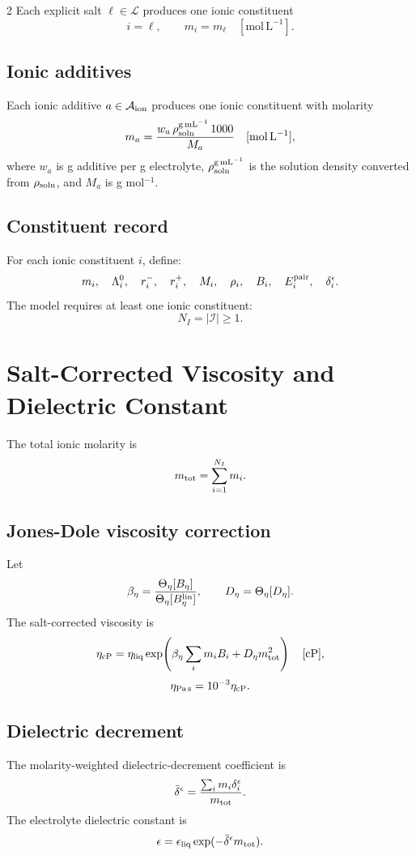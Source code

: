 \documentclass[10pt]{article}
\newcommand{\molL}{\mathrm{mol\,L^{-1}}}
\newcommand{\cp}{\mathrm{cP}}
\begin{document}
\begin{multicols}{2}
Each explicit salt \(\ell\in\mathcal L\) produces one ionic constituent
\[
i=\ell,
\qquad
m_i=m_\ell
\quad [\molL].
\]

\subsection{Ionic additives}

Each ionic additive \(a\in\mathcal A_{\rm ion}\) produces one ionic constituent
with molarity
\[
m_a
=
\frac{w_a\,\rho_{\rm soln}^{\rm g\,mL^{-1}}\,1000}{M_a}
\quad [\molL],
\]
where \(w_a\) is g additive per g electrolyte,
\(\rho_{\rm soln}^{\rm g\,mL^{-1}}\) is the solution density converted from
\(\rho_{\rm soln}\), and \(M_a\) is g mol\(^{-1}\).

\subsection{Constituent record}

For each ionic constituent \(i\), define:
\[
m_i,\quad
\Lambda^0_i,\quad
r^-_i,\quad
r^+_i,\quad
M_i,\quad
\rho_i,\quad
B_i,\quad
E^{\rm pair}_i,\quad
\delta^\epsilon_i.
\]
The model requires at least one ionic constituent:
\[
N_I = |\mathcal I| \ge 1.
\]

\section{Salt-Corrected Viscosity and Dielectric Constant}

The total ionic molarity is
\[
m_{\rm tot}=\sum_{i=1}^{N_I}m_i.
\]

\subsection{Jones-Dole viscosity correction}

Let
\[
\beta_\eta =
\frac{
\Theta_\eta[B_\eta]
}{
\Theta_\eta[B_\eta^{\rm lin}]
},
\qquad
D_\eta=\Theta_\eta[D_\eta].
\]
The salt-corrected viscosity is
\[
\eta_{\rm cP}
=
\eta_{\rm liq}
\exp\!\left(
\beta_\eta\sum_i m_i B_i + D_\eta m_{\rm tot}^2
\right)
\quad [\cp],
\]
\[
\eta_{\rm Pa\,s}=10^{-3}\eta_{\rm cP}.
\]

\subsection{Dielectric decrement}

The molarity-weighted dielectric-decrement coefficient is
\[
\bar\delta^\epsilon
=
\frac{\sum_i m_i\delta^\epsilon_i}{m_{\rm tot}}.
\]
The electrolyte dielectric constant is
\[
\epsilon
=
\epsilon_{\rm liq}\exp(-\bar\delta^\epsilon m_{\rm tot}).
\]


\end{multicols}
\end{document}
